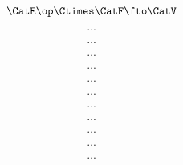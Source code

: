 \begin{forslides}
     \begin{equation}
        \label{eq:slides_enrichment_55}
       \CatE\op \Ctimes \CatF \fto \CatV
    \end{equation}
    
     \begin{equation}
        \label{eq:slides_enrichment_56}
       ...
    \end{equation}
    
     \begin{equation}
        \label{eq:slides_enrichment_57}
       ...
    \end{equation}
    
     \begin{equation}
        \label{eq:slides_enrichment_58}
       ...
    \end{equation}
    
     \begin{equation}
        \label{eq:slides_enrichment_59}
       ...
    \end{equation}
    
    \begin{equation}
        \label{eq:slides_enrichment_60}
       ...
    \end{equation}
    
     \begin{equation}
        \label{eq:slides_enrichment_61}
       ...
    \end{equation}
    
     \begin{equation}
        \label{eq:slides_enrichment_62}
       ...
    \end{equation}
    
     \begin{equation}
        \label{eq:slides_enrichment_63}
       ...
    \end{equation}
    
     \begin{equation}
        \label{eq:slides_enrichment_64}
       ...
    \end{equation}
    
     \begin{equation}
        \label{eq:slides_enrichment_65}
       ...
    \end{equation}
    
     \begin{equation}
        \label{eq:slides_enrichment_66}
       ...
    \end{equation}
    

\end{forslides}
